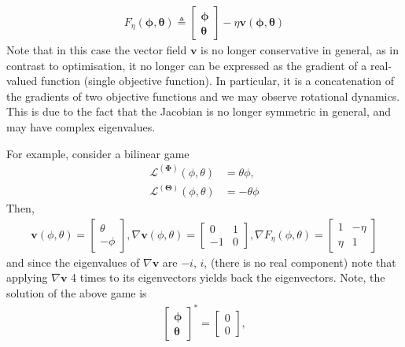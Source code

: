 \documentclass{article}
\renewcommand{\vec}[1]{\ensuremath{\boldsymbol{#1}}}
\newcommand{\btheta}[0]{\ensuremath{\boldsymbol{\theta}}}
\newcommand{\bphi}[0]{\ensuremath{\boldsymbol{\phi}}}
\newcommand{\ltheta}[0]{\ensuremath{\mathcal{L}^{(\boldsymbol{\Theta})}}}
\newcommand{\lphi}[0]{\ensuremath{\mathcal{L}^{(\boldsymbol{\Phi})}}}
\newcommand{\phth}[0]{\ensuremath{(\boldsymbol{\phi}, \boldsymbol{\theta})}}
\begin{document}
\begin{align}
    F_\eta \phth \triangleq \begin{bmatrix}
        \bphi \\
        \btheta
    \end{bmatrix}
    - \eta \vec{v}\phth
\end{align}
Note that in this case the vector field $\vec{v}$ is no longer conservative in general, as in contrast to optimisation, it no longer can be expressed as the gradient of a real-valued function (single objective function). In particular, it is a concatenation of the gradients of two objective functions and we may observe rotational dynamics. This is due to the fact that the Jacobian is no longer symmetric in general, and may have complex eigenvalues.

For example, consider a bilinear game
\begin{align}
    \lphi (\phi, \theta) &= \theta \phi, \nonumber \\
    \ltheta (\phi, \theta) &= -\theta \phi
\end{align}
Then, 
\begin{align}
    \vec{v} (\phi, \theta) = \begin{bmatrix}
        \theta \\
        -\phi
    \end{bmatrix},
    \nabla \vec{v} (\phi, \theta) = \begin{bmatrix}
        0 & 1 \\
        -1 & 0
    \end{bmatrix},
    \nabla F_\eta(\phi, \theta) = \begin{bmatrix}
        1 & -\eta \\
        \eta & 1
    \end{bmatrix}
\end{align}
and since the eigenvalues of $\nabla\vec{v}$ are $-i$, $i$, (there is no real component) note that applying $\nabla\vec{v}$ 4 times to its eigenvectors yields back the eigenvectors. Note, the solution of the above game is \begin{align}
    \begin{bmatrix}
        \bphi \\
        \btheta
    \end{bmatrix}^* = 
    \begin{bmatrix}
        0 \\
        0
    \end{bmatrix},   
\end{align}
\end{document}
